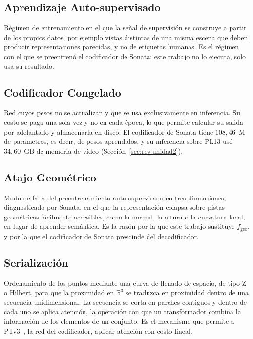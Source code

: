\subsection{Aprendizaje Auto-supervisado}
\label{sec:ssl}

Régimen de entrenamiento en el que la señal de supervisión se construye a partir
de los propios datos, por ejemplo vistas distintas de una misma escena que deben
producir representaciones parecidas, y no de etiquetas humanas.  Es el régimen con el que se preentrenó el codificador de Sonata; este trabajo
no lo ejecuta, solo usa su resultado.

\subsection{Codificador Congelado}
\label{sec:congelado}

Red cuyos pesos no se actualizan y que se usa exclusivamente en inferencia. Su
costo se paga una sola vez y no en cada época, lo que permite calcular su salida
por adelantado y almacenarla en disco. El codificador de Sonata tiene
$108{,}46$~M de parámetros, es decir, de pesos aprendidos, y su inferencia sobre PL13
usó $34{,}60$~GB de memoria de vídeo (Sección~\ref{sec:res-unidad2}).

\subsection{Atajo Geométrico}
\label{sec:atajo}

Modo de falla del preentrenamiento auto-supervisado en tres dimensiones,
diagnosticado por Sonata, en el que la representación colapsa sobre pistas geométricas
fácilmente accesibles, como la normal, la altura o la curvatura local, en lugar
de aprender semántica. Es la razón por la que este trabajo sustituye $f_{\mathrm{geo}}$, y por la que
el codificador de Sonata prescinde del decodificador.

\subsection{Serialización}
\label{sec:serializacion}

Ordenamiento de los puntos mediante una curva de llenado de espacio, de tipo Z o
Hilbert, para que la proximidad en $\mathbb{R}^3$ se traduzca en proximidad
dentro de una secuencia unidimensional. La secuencia se corta en parches
contiguos y dentro de cada uno se aplica atención, la operación con que un
transformador combina la información de los elementos de un conjunto. Es el
mecanismo que permite a PTv3~\cite{wu2024ptv3}, la red del codificador, aplicar
 atención con costo lineal.

